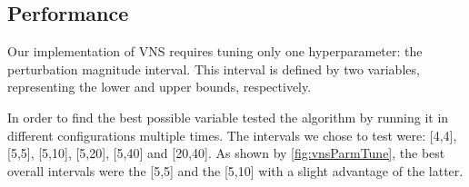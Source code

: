 
\subsection{Performance}

Our implementation of VNS requires tuning only one hyperparameter: the perturbation magnitude interval.
This interval is defined by two variables, representing the lower and upper bounds, respectively.

In order to find the best possible variable tested the algorithm by running it in different configurations multiple times.
The intervals we chose to test were: [4,4], [5,5], [5,10], [5,20], [5,40] and [20,40].
As shown by \figurename{ \ref{fig:vnsParmTune}}, the best overall intervals were the [5,5] and the [5,10] with a slight advantage of the latter.

